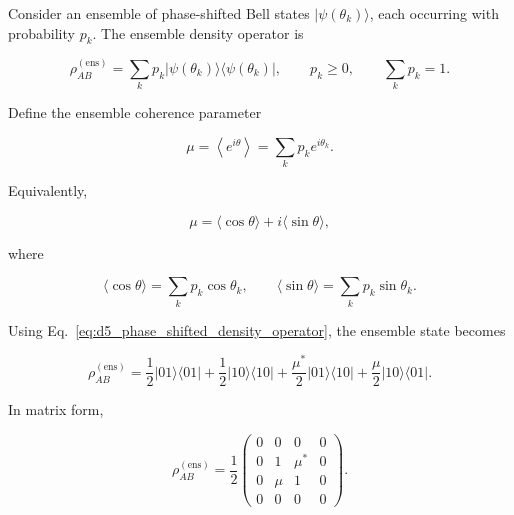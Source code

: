 Consider an ensemble of phase-shifted Bell states \( |\psi(\theta_k)\rangle \), each occurring with probability \( p_k \). The ensemble density operator is

\begin{equation}
\rho_{AB}^{(\mathrm{ens})}
=
\sum_k p_k |\psi(\theta_k)\rangle\langle\psi(\theta_k)|,
\qquad
p_k \ge 0,
\qquad
\sum_k p_k = 1.
\label{eq:d5_random_phase_ensemble_density_definition}
\end{equation}

Define the ensemble coherence parameter

\begin{equation}
\mu
=
\left\langle e^{i\theta}\right\rangle
=
\sum_k p_k e^{i\theta_k}.
\label{eq:d5_coherence_parameter_mu_definition}
\end{equation}

Equivalently,

\begin{equation}
\mu
=
\langle\cos\theta\rangle
+
i\langle\sin\theta\rangle,
\label{eq:d5_coherence_parameter_mu_trigonometric}
\end{equation}

where

\begin{equation}
\langle\cos\theta\rangle
=
\sum_k p_k \cos\theta_k,
\qquad
\langle\sin\theta\rangle
=
\sum_k p_k \sin\theta_k.
\label{eq:d5_cos_sin_phase_averages}
\end{equation}

Using Eq.~\eqref{eq:d5_phase_shifted_density_operator}, the ensemble state becomes

\begin{equation}
\rho_{AB}^{(\mathrm{ens})}
=
\frac{1}{2}|01\rangle\langle 01|
+
\frac{1}{2}|10\rangle\langle 10|
+
\frac{\mu^*}{2}|01\rangle\langle 10|
+
\frac{\mu}{2}|10\rangle\langle 01|.
\label{eq:d5_random_phase_ensemble_density_explicit}
\end{equation}

In matrix form,

\begin{equation}
\rho_{AB}^{(\mathrm{ens})}
=
\frac{1}{2}
\begin{pmatrix}
0 & 0 & 0 & 0 \\
0 & 1 & \mu^* & 0 \\
0 & \mu & 1 & 0 \\
0 & 0 & 0 & 0
\end{pmatrix}.
\label{eq:d5_random_phase_ensemble_density_matrix}
\end{equation}

